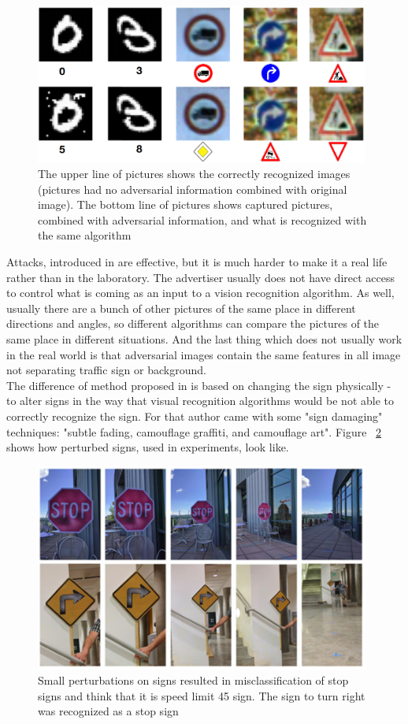 \begin{figure}[H]
	\centering  	
	\includegraphics[width=11cm]{img/WrongPictures.png}
	\caption{The upper line of pictures shows the correctly recognized images (pictures had no adversarial information combined with original image). The bottom line of pictures shows captured pictures, combined with adversarial information, and what is recognized with the same algorithm \cite{blackBox1}}
	\label{fig:WrongPictures}    
\end{figure}

Attacks, introduced in \cite{blackBox1} are effective, but it is much harder to make it a real life rather than in the laboratory. The advertiser usually does not have direct access to control what is coming as an input to a vision recognition algorithm. As well, usually there are a bunch of other pictures of the same place in different directions and angles, so different algorithms can compare the pictures of the same place in different situations. And the last thing which does not usually work in the real world is that adversarial images contain the same features in all image not separating traffic sign or background. \\
The difference of method proposed in \cite{signs} is based on changing the sign physically - to alter signs in the way that visual recognition algorithms would be not able to correctly recognize the sign. For that author came with some "sign damaging" techniques: "subtle fading, camouflage graffiti, and camouflage art". Figure ~\ref{fig:perturbedsigns} shows how perturbed signs, used in experiments, look like.

\begin{figure}[H]
	\centering  	
	\includegraphics[width=11cm]{img/perturbedsigns.png}
	\caption{Small perturbations on signs resulted in misclassification of stop signs and think that it is speed limit 45 sign. The sign to turn right was recognized as a stop sign \cite{signs}}
	\label{fig:perturbedsigns}    
\end{figure}

